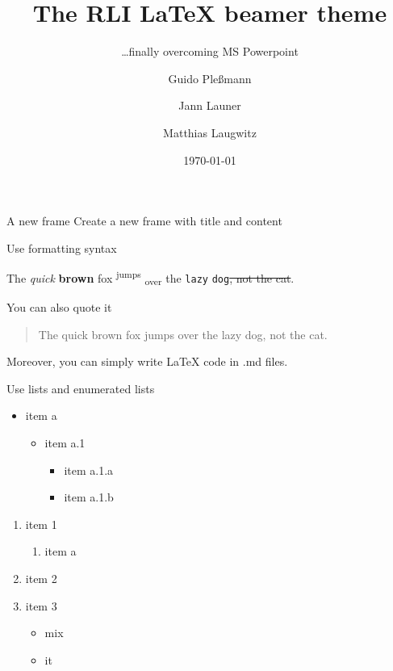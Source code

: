 \documentclass[ignorenonframetext,aspectratio=169]{beamer}
\title{The RLI \LaTeX{} beamer theme}
\subtitle{\ldots finally overcoming MS Powerpoint}
\author{Guido Pleßmann \and Jann Launer \and Matthias Laugwitz}
\date{\today}
\institute{Reiner Lemoine Institut}
\begin{document}
\frame{\titlepage}

\begin{frame}[fragile]{A new frame}
Create a new frame with title and content

\end{frame}

\begin{frame}[fragile]{Use formatting syntax}

The \emph{quick} \textbf{brown} fox \textsuperscript{jumps}
\textsubscript{over} the \texttt{lazy} \texttt{dog}\sout{, not the cat}.

You can also quote it

\begin{quote}
The quick brown fox jumps over the lazy dog, not the cat.
\end{quote}

Moreover, you can simply write \LaTeX{} code in .md files.

\end{frame}

\begin{frame}{Use lists and enumerated lists}

\begin{itemize}
\item item a

  \begin{itemize}
  \item item a.1

    \begin{itemize}
    \item item a.1.a
    \item item a.1.b
    \end{itemize}
  \end{itemize}
\end{itemize}

\begin{enumerate}
\item item 1

  \begin{enumerate}
  \item item a
  \end{enumerate}
\item item 2
\item item 3

  \begin{itemize}
  \item mix
  \item it
  \end{itemize}
\end{enumerate}

\end{frame}
\end{document}
